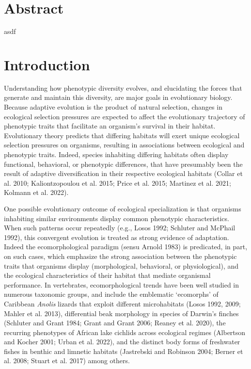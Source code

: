 \documentclass[
  11pt,
]{article}
\begin{document}
\newpage

\hypertarget{abstract}{%
\section{Abstract}\label{abstract}}

asdf

\newpage

\hypertarget{introduction}{%
\section{Introduction}\label{introduction}}

Understanding how phenotypic diversity evolves, and elucidating the
forces that generate and maintain this diversity, are major goals in
evolutionary biology. Because adaptive evolution is the product of
natural selection, changes in ecological selection pressures are
expected to affect the evolutionary trajectory of phenotypic traits that
facilitate an organism's survival in their habitat. Evolutionary theory
predicts that differing habitats will exert unique ecological selection
pressures on organisms, resulting in associations between ecological and
phenotypic traits. Indeed, species inhabiting differing habitats often
display functional, behavioral, or phenotypic differences, that have
presumably been the result of adaptive diversification in their
respective ecological habitats (Collar et al. 2010; Kaliontzopoulou et
al. 2015; Price et al. 2015; Martinez et al. 2021; Kolmann et al. 2022).
\hfill\break

One possible evolutionary outcome of ecological specialization is that
organisms inhabiting similar environments display common phenotypic
characteristics. When such patterns occur repeatedly (e.g., Losos 1992;
Schluter and McPhail 1992), this convergent evolution is treated as
strong evidence of adaptation. Indeed the ecomorphological paradigm
(sensu Arnold 1983) is predicated, in part, on such cases, which
emphasize the strong association between the phenotypic traits that
organisms display (morphological, behavioral, or physiological), and the
ecological characteristics of their habitat that mediate organismal
performance. In vertebrates, ecomorphological trends have been well
studied in numerous taxonomic groups, and include the emblematic
`ecomorphs' of Caribbean \emph{Anolis} lizards that exploit different
microhabitats (Losos 1992, 2009; Mahler et al. 2013), differential beak
morphology in species of Darwin's finches (Schluter and Grant 1984;
Grant and Grant 2006; Reaney et al. 2020), the recurring phenotypes of
African lake cichlids across ecological regimes (Albertson and Kocher
2001; Urban et al. 2022), and the distinct body forms of freshwater
fishes in benthic and limnetic habitats (Jastrebski and Robinson 2004;
Berner et al. 2008; Stuart et al. 2017) among others. \hfill\break
\end{document}
